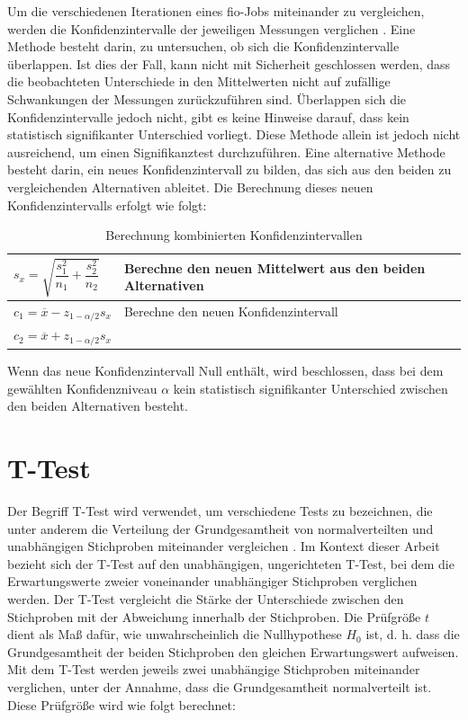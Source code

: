 Um die verschiedenen Iterationen eines fio-Jobs miteinander zu vergleichen, werden die Konfidenzintervalle der jeweiligen Messungen verglichen \cite{statistically_rigorous}. 
Eine Methode besteht darin, zu untersuchen, ob sich die Konfidenzintervalle überlappen. 
Ist dies der Fall, kann nicht mit Sicherheit geschlossen werden, dass die beobachteten Unterschiede in den Mittelwerten nicht auf zufällige Schwankungen der Messungen zurückzuführen sind.
Überlappen sich die Konfidenzintervalle jedoch nicht, gibt es keine Hinweise darauf, 
dass kein statistisch signifikanter Unterschied vorliegt. 
Diese Methode allein ist jedoch nicht ausreichend, um einen Signifikanztest durchzuführen. 
Eine alternative Methode besteht darin, ein neues Konfidenzintervall zu bilden, das sich aus den beiden zu vergleichenden Alternativen ableitet.
 Die Berechnung dieses neuen Konfidenzintervalls erfolgt wie folgt:

\begin{center}
  \begin{table}[h!]
    \begin{tabularx}{\textwidth}{|X|X|}
      \hline
       $s_x =  \sqrt{\dfrac{s^2_1}{n_1} + \dfrac{s^2_2}{n_2}}$ & Berechne den neuen Mittelwert aus den beiden Alternativen  \\ 
      \hline
      $c_1 = \overline{x} - z_{1-\alpha/2} s_x$ & Berechne den neuen Konfidenzintervall \\
      $c_2 = \overline{x} + z_{1-\alpha/2} s_x$ & \\
      \hline
    \end{tabularx}
    \caption{Berechnung kombinierten Konfidenzintervallen}
    \label{tab:two_Iteration_Konfidenzintervall}
  \end{table}
\end{center}

Wenn das neue Konfidenzintervall Null enthält, wird beschlossen, 
dass bei dem gewählten Konfidenzniveau $\alpha$ kein statistisch signifikanter Unterschied zwischen den beiden Alternativen besteht.

\section{T-Test}
Der Begriff T-Test wird verwendet, um verschiedene Tests zu bezeichnen, die unter anderem die Verteilung der Grundgesamtheit von normalverteilten 
und unabhängigen Stichproben miteinander vergleichen \cite{inferenzstatistik}. Im Kontext dieser Arbeit bezieht sich der T-Test auf den unabhängigen, ungerichteten T-Test, 
bei dem die Erwartungswerte zweier voneinander unabhängiger Stichproben verglichen werden.
Der T-Test vergleicht die Stärke der Unterschiede zwischen den Stichproben mit der Abweichung innerhalb der Stichproben. 
Die Prüfgröße $t$ dient als Maß dafür, wie unwahrscheinlich die Nullhypothese $H_0$ ist, 
d. h. dass die Grundgesamtheit der beiden Stichproben den gleichen Erwartungswert aufweisen. 
Mit dem T-Test werden jeweils zwei unabhängige Stichproben miteinander verglichen, unter der Annahme, dass die Grundgesamtheit normalverteilt ist.
Diese Prüfgröße wird wie folgt berechnet:

